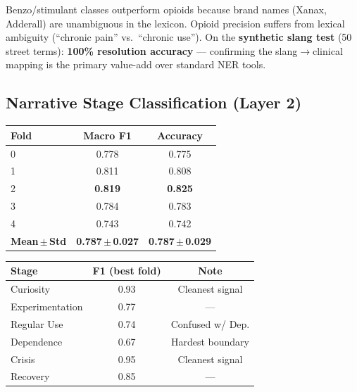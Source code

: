 \documentclass[10pt,twocolumn]{article}
\begin{document}
Benzo/stimulant classes outperform opioids because brand names (Xanax,
Adderall) are unambiguous in the lexicon. Opioid precision suffers from
lexical ambiguity (``chronic pain'' vs.\ ``chronic use''). On the
\textbf{synthetic slang test} (50 street terms): \textbf{100\% resolution
accuracy} --- confirming the slang$\to$clinical mapping is the primary
value-add over standard NER tools.

\subsection{Narrative Stage Classification (Layer 2)}

\begin{center}{\small\setlength{\tabcolsep}{4pt}
\begin{tabular}{@{}lcc@{}}
\toprule
\textbf{Fold} & \textbf{Macro F1} & \textbf{Accuracy}\\
\midrule
0 & 0.778 & 0.775\\
1 & 0.811 & 0.808\\
2 & \textbf{0.819} & \textbf{0.825}\\
3 & 0.784 & 0.783\\
4 & 0.743 & 0.742\\
\midrule
\textbf{Mean\,$\pm$\,Std}&\textbf{0.787\,$\pm$\,0.027}&\textbf{0.787\,$\pm$\,0.029}\\
\bottomrule
\end{tabular}}\end{center}

\begin{center}{\small\setlength{\tabcolsep}{5pt}
\begin{tabular}{@{}lcc@{}}
\toprule
\textbf{Stage} & \textbf{F1 (best fold)} & \textbf{Note}\\
\midrule
\textcolor{signalc}{Curiosity}            & 0.93 & Cleanest signal\\
\textcolor{signalb}{Experimentation}      & 0.77 & ---\\
\textcolor{signalo!80!black}{Regular Use} & 0.74 & Confused w/ Dep.\\
\textcolor{signalo}{Dependence}           & 0.67 & Hardest boundary\\
\textcolor{signalr}{Crisis}              & 0.95 & Cleanest signal\\
\textcolor{signalg}{Recovery}             & 0.85 & ---\\
\bottomrule
\end{tabular}}\end{center}
\end{document}
